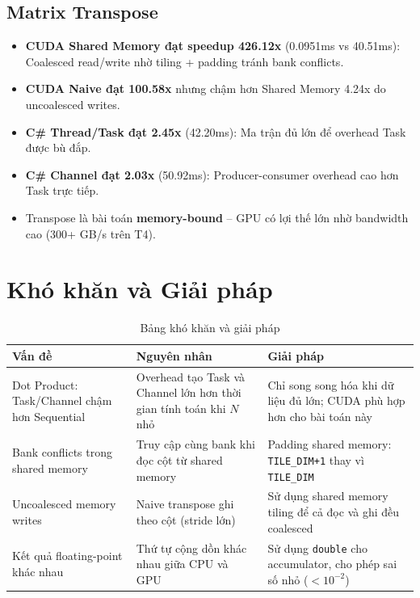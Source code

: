 \documentclass[12pt,a4paper]{article}
\begin{document}
\subsection{Matrix Transpose}
\begin{itemize}
    \item \textbf{CUDA Shared Memory đạt speedup 426.12x} (0.0951ms vs 40.51ms): Coalesced read/write nhờ tiling + padding tránh bank conflicts.
    \item \textbf{CUDA Naive đạt 100.58x} nhưng chậm hơn Shared Memory 4.24x do uncoalesced writes.
    \item \textbf{C\# Thread/Task đạt 2.45x} (42.20ms): Ma trận đủ lớn để overhead Task được bù đắp.
    \item \textbf{C\# Channel đạt 2.03x} (50.92ms): Producer-consumer overhead cao hơn Task trực tiếp.
    \item Transpose là bài toán \textbf{memory-bound} -- GPU có lợi thế lớn nhờ bandwidth cao (300+ GB/s trên T4).
\end{itemize}

\section{Khó khăn và Giải pháp}

\begin{table}[H]
\centering
\caption{Bảng khó khăn và giải pháp}
\begin{tabular}{p{3.5cm}p{4.5cm}p{4.5cm}}
\toprule
\textbf{Vấn đề} & \textbf{Nguyên nhân} & \textbf{Giải pháp} \\
\midrule
Dot Product: Task/Channel chậm hơn Sequential & Overhead tạo Task và Channel lớn hơn thời gian tính toán khi $N$ nhỏ & Chỉ song song hóa khi dữ liệu đủ lớn; CUDA phù hợp hơn cho bài toán này \\
\midrule
Bank conflicts trong shared memory & Truy cập cùng bank khi đọc cột từ shared memory & Padding shared memory: \texttt{TILE\_DIM+1} thay vì \texttt{TILE\_DIM} \\
\midrule
Uncoalesced memory writes & Naive transpose ghi theo cột (stride lớn) & Sử dụng shared memory tiling để cả đọc và ghi đều coalesced \\
\midrule
Kết quả floating-point khác nhau & Thứ tự cộng dồn khác nhau giữa CPU và GPU & Sử dụng \texttt{double} cho accumulator, cho phép sai số nhỏ ($< 10^{-2}$) \\
\bottomrule
\end{tabular}
\end{table}
\end{document}
